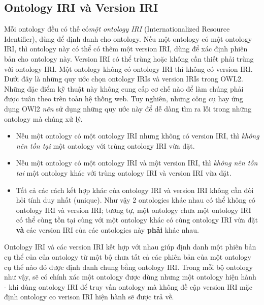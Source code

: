 \subsection{Ontology IRI và Version IRI}
Mỗi ontology đều có thế có\textit{một ontology IRI\cite{iri}} (Internationalized Resource Identifier), dùng để định danh cho ontology. Nếu một ontology có một ontology IRI, thì ontology này có thể có thêm một version IRI, dùng để xác định phiên bản cho ontology này. Version IRI có thể trùng hoặc không cần thiết phải trùng với ontology IRI. Một ontology không có ontology IRI thì không có version IRI.
Dưới đây là những quy ước chọn ontology IRIs và version IRIs trong OWL2. Những đặc điểm kỹ thuật này không cung cấp cơ chế nào để làm chúng phải được tuân theo trên toàn hệ thống web. Tuy nghiên, những công cụ hay ứng dụng OWl2 \textit{nên} sử dụng những quy ước này để dễ dàng tìm ra lỗi trong những ontology mà chúng xử lý.
\begin{itemize}
\item Nếu một ontology có một ontology IRI nhưng không có version IRI, thì \textit{không nên tồn tại} một ontology với trùng ontology IRI vừa đặt.
\item Nếu một ontology có một ontology IRI và một version IRI, thì \textit{không nên tồn tai} một ontology khác với trùng ontology IRI và version IRI vừa đặt.
\item Tất cả các cách kết hợp khác của ontology IRI và version IRI không cần đòi hỏi tính duy nhất (unique). Như vậy 2 ontologies khác nhau có thể không có ontology IRI và version IRI; tương tự, một ontology chưa một ontology IRI có thể cùng tồn tại cùng với một ontology khác có cùng ontology IRI vừa đặt \textbf{và} các version IRI của các ontologies này \textbf{phải} khác nhau.
\end{itemize}
Ontology IRI và các version IRI kết hợp với nhau giúp định danh một phiên bản cụ thể của của ontology từ một bộ chưa tất cả các phiên bản của một ontology cụ thể nào đó được định danh chung bằng ontology IRI. Trong mỗi bộ ontology như vậy, sẽ có chính xác một ontology được dùng nhưng một ontology hiện hành - khi dùng ontology IRI để truy vấn ontology mà không đề cập version IRI mặc định ontology co verison IRI hiện hành sẽ được trả về.


